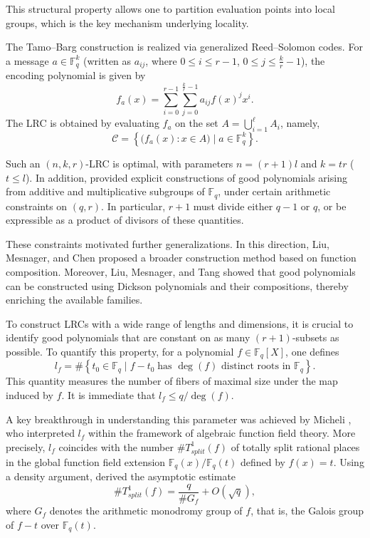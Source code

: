 \documentclass[1p,final]{elsarticle}
\newtheorem{open problem}[theorem]{Open Problem}
\begin{document}
This structural property allows one to partition evaluation points into local groups, which is the key mechanism underlying locality.

\medskip

The Tamo--Barg construction is realized via generalized Reed--Solomon codes. For a message $a\in \mathbb{F}_{q}^{k}$ (written as $a_{ij}$, where $0\le i\le r-1$, $0\le j\le \frac{k}{r}-1$), the encoding polynomial is given by
\[
f_{a}(x) = \sum_{i=0}^{r-1} \sum_{j=0}^{\frac{k}{r}-1} a_{ij} f(x)^{j}x^{i}.
\]
The LRC is obtained by evaluating $f_{a}$ on the set \( A = \bigcup_{i=1}^{\ell} A_{i} \), namely,
\[
\mathcal{C} = \left\{ \big( f_{a}(x) : x \in A \big) \mid a \in \mathbb{F}_{q}^{k} \right\}.
\]

Such an \( (n, k, r) \)-LRC is optimal, with parameters $n=(r+1)l$ and $k=tr$ ($t\le l$). In addition, \cite{Tamo Barg 2014} provided explicit constructions of good polynomials arising from additive and multiplicative subgroups of $\mathbb{F}_{q}$, under certain arithmetic constraints on $(q,r)$. In particular, $r+1$ must divide either $q-1$ or $q$, or be expressible as a product of divisors of these quantities.

\medskip

These constraints motivated further generalizations. In this direction, Liu, Mesnager, and Chen \cite{Liu Mesnager Chen 2018} proposed a broader construction method based on function composition. Moreover, Liu, Mesnager, and Tang \cite{Liu Mesnager Tang 2020} showed that good polynomials can be constructed using Dickson polynomials and their compositions, thereby enriching the available families.

\medskip

To construct LRCs with a wide range of lengths and dimensions, it is crucial to identify good polynomials that are constant on as many $(r+1)$-subsets as possible. To quantify this property, for a polynomial $f\in\mathbb{F}_{q}[X]$, one defines
\begin{equation}
l_{f}=\label{size}
\#\left \{ t_{0}\in\mathbb{F}_{q}\mid f-t_{0} \; \text{has $\deg(f)$ distinct roots in $\mathbb{F}_{q}$} \right \}.
\end{equation}
This quantity measures the number of fibers of maximal size under the map induced by $f$. It is immediate that $l_{f}\le q/\deg(f)$.

\medskip

A key breakthrough in understanding this parameter was achieved by Micheli \cite{Micheli 2020}, who interpreted $l_{f}$ within the framework of algebraic function field theory. More precisely, $l_{f}$ coincides with the number $\#T^1_{split}(f)$ of totally split rational places in the global function field extension $\mathbb{F}_{q}(x)/ \mathbb{F}_{q}(t)$ defined by $f(x)=t$. Using a density argument, \cite{Micheli 2020} derived the asymptotic estimate
\[
\#T^1_{split}(f) = \frac{q}{\#G_{f}} + O(\sqrt{q}),
\]
where $G_{f}$ denotes the arithmetic monodromy group of $f$, that is, the Galois group of $f-t$ over $\mathbb{F}_{q}(t)$.
\end{document}
